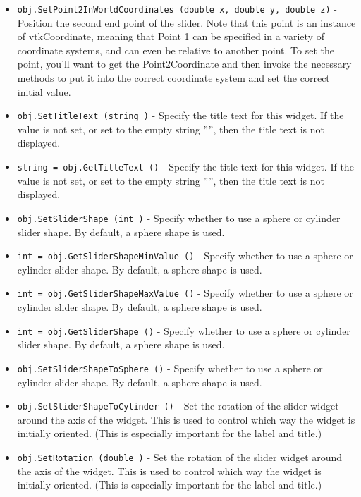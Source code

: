 \begin{itemize}
\item  \verb|obj.SetPoint2InWorldCoordinates (double x, double y, double z)| -  Position the second end point of the slider. Note that this point is an
 instance of vtkCoordinate, meaning that Point 1 can be specified in a
 variety of coordinate systems, and can even be relative to another
 point. To set the point, you'll want to get the Point2Coordinate and
 then invoke the necessary methods to put it into the correct coordinate
 system and set the correct initial value.

\item  \verb|obj.SetTitleText (string )| -  Specify the title text for this widget. If the value is not set, or set
 to the empty string '''', then the title text is not displayed.

\item  \verb|string = obj.GetTitleText ()| -  Specify the title text for this widget. If the value is not set, or set
 to the empty string '''', then the title text is not displayed.

\item  \verb|obj.SetSliderShape (int )| -  Specify whether to use a sphere or cylinder slider shape. By default, a
 sphere shape is used.

\item  \verb|int = obj.GetSliderShapeMinValue ()| -  Specify whether to use a sphere or cylinder slider shape. By default, a
 sphere shape is used.

\item  \verb|int = obj.GetSliderShapeMaxValue ()| -  Specify whether to use a sphere or cylinder slider shape. By default, a
 sphere shape is used.

\item  \verb|int = obj.GetSliderShape ()| -  Specify whether to use a sphere or cylinder slider shape. By default, a
 sphere shape is used.

\item  \verb|obj.SetSliderShapeToSphere ()| -  Specify whether to use a sphere or cylinder slider shape. By default, a
 sphere shape is used.

\item  \verb|obj.SetSliderShapeToCylinder ()| -  Set the rotation of the slider widget around the axis of the widget. This is
 used to control which way the widget is initially oriented. (This is especially
 important for the label and title.)

\item  \verb|obj.SetRotation (double )| -  Set the rotation of the slider widget around the axis of the widget. This is
 used to control which way the widget is initially oriented. (This is especially
 important for the label and title.)


\end{itemize}
